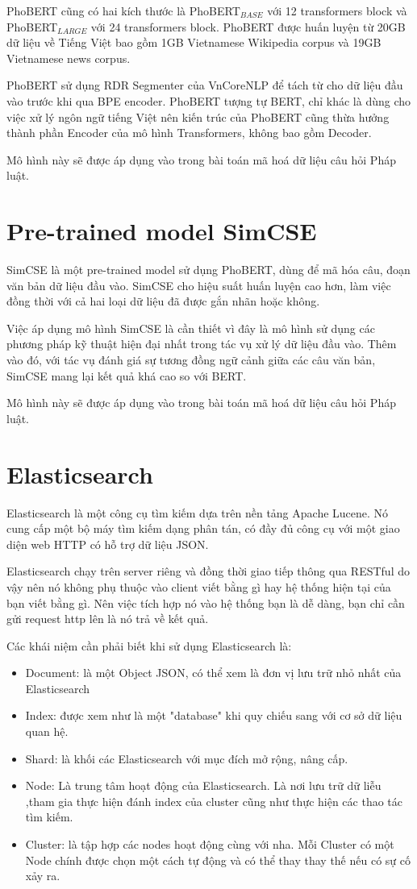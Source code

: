 PhoBERT cũng có hai kích thước là PhoBERT$_{BASE}$ với 12 transformers block và PhoBERT$_{LARGE}$ với 24 transformers block. PhoBERT được huấn luyện từ 20GB dữ liệu về Tiếng Việt bao gồm 1GB Vietnamese Wikipedia corpus và 19GB Vietnamese news corpus. 

PhoBERT sử dụng RDR Segmenter của VnCoreNLP để tách từ cho dữ liệu đầu vào trước khi qua BPE encoder. PhoBERT tượng tự BERT, chỉ khác là dùng cho việc xử lý ngôn ngữ tiếng Việt nên kiến trúc của PhoBERT cũng thừa hưởng thành phần Encoder của mô hình Transformers, không bao gồm Decoder.

Mô hình này sẽ được áp dụng vào trong bài toán mã hoá dữ liệu câu hỏi Pháp luật.
\section{Pre-trained model SimCSE}

SimCSE\cite{gao2021simcse} là một pre-trained model sử dụng PhoBERT, dùng để mã hóa câu, đoạn văn bản dữ liệu đầu vào. SimCSE cho hiệu suất huấn luyện cao hơn, làm việc đồng thời với cả hai loại dữ liệu đã được gắn nhãn hoặc không.

Việc áp dụng mô hình SimCSE là cần thiết vì đây là mô hình sử dụng các phương pháp kỹ thuật hiện đại nhất trong tác vụ xử lý dữ liệu đầu vào. Thêm vào đó, với tác vụ đánh giá sự tương đồng ngữ cảnh giữa các câu văn bản, SimCSE mang lại kết quả khá cao so với BERT.

Mô hình này sẽ được áp dụng vào trong bài toán mã hoá dữ liệu câu hỏi Pháp luật.
\section{Elasticsearch}
Elasticsearch là một công cụ tìm kiếm dựa trên nền tảng Apache Lucene. Nó cung cấp một bộ máy tìm kiếm dạng phân tán, có đầy đủ công cụ với một giao diện web HTTP có hỗ trợ dữ liệu JSON.

Elasticsearch chạy trên server riêng và đồng thời giao tiếp thông qua RESTful do vậy nên nó không phụ thuộc vào client viết bằng gì hay hệ thống hiện tại của bạn viết bằng gì. Nên việc tích hợp nó vào hệ thống bạn là dễ dàng, bạn chỉ cần gửi request http lên là nó trả về kết quả.

Các khái niệm cần phải biết khi sử dụng Elasticsearch\cite{ES} là:
\begin{itemize}
	\item Document: là một Object JSON, có thể xem là đơn vị lưu trữ nhỏ nhất của Elasticsearch
	\item Index: được xem như là một "database" khi quy chiếu sang với cơ sở dữ liệu quan hệ.
	\item Shard: là khối các Elasticsearch với mục đích mở rộng, nâng cấp.
	\item Node: Là trung tâm hoạt động của Elasticsearch. Là nơi lưu trữ dữ liễu ,tham gia thực hiện đánh index của cluster cũng như thực hiện các thao tác tìm kiếm.
	\item Cluster: là tập hợp các nodes hoạt động cùng với nha. Mỗi Cluster có một Node chính được chọn một cách tự động và có thể thay thay thế nếu có sự cố xảy ra.
\end{itemize}

